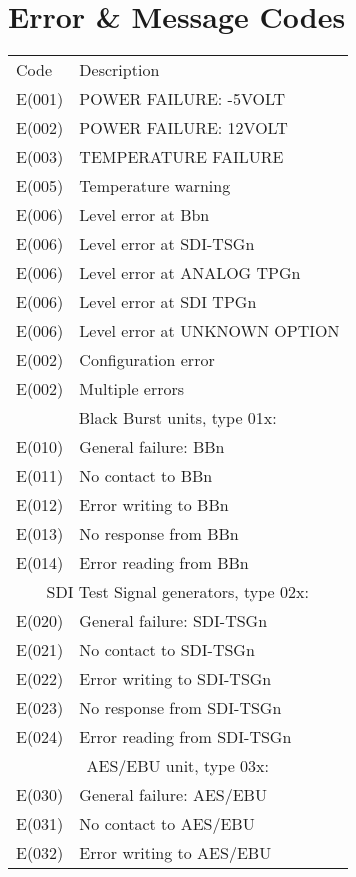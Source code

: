 \section{Error \& Message Codes}
\label{cha:error_codes}

\begin{longtable}{|l|l|}
\hline
Code & Description\\
E(001)& POWER FAILURE: -5VOLT\\ \hline
E(002)& POWER FAILURE: 12VOLT\\ \hline
E(003)& TEMPERATURE FAILURE\\ \hline
E(005)& Temperature warning\\ \hline
E(006)& Level error at Bbn\\ \hline
E(006)& Level error at SDI-TSGn\\ \hline
E(006)& Level error at ANALOG TPGn\\ \hline
E(006)& Level error at SDI TPGn\\ \hline
E(006)& Level error at UNKNOWN OPTION\\ \hline
E(002)& Configuration error\\ \hline
E(002)& Multiple errors\\ \hline
\multicolumn{2}{|c|}{Black Burst units, type 01x:}\\ \hline
E(010)& General failure: BBn\\ \hline
E(011)& No contact to BBn\\ \hline
E(012)& Error writing to BBn\\ \hline
E(013)& No response from BBn\\ \hline
E(014)& Error reading from BBn\\ \hline
\multicolumn{2}{|c|}{SDI Test Signal generators, type 02x:}\\ \hline
E(020)& General failure: SDI-TSGn\\ \hline
E(021)& No contact to SDI-TSGn\\ \hline
E(022)& Error writing to SDI-TSGn\\ \hline
E(023)& No response from SDI-TSGn\\ \hline
E(024)& Error reading from SDI-TSGn\\ \hline
\multicolumn{2}{|c|}{AES/EBU unit, type 03x:}\\ \hline
E(030)& General failure: AES/EBU\\ \hline
E(031)& No contact to AES/EBU\\ \hline
E(032)& Error writing to AES/EBU\\ \hline

\end{longtable}

